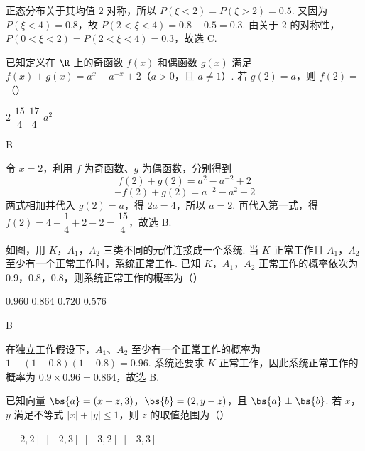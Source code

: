 \begin{solution}
正态分布关于其均值 \(2\) 对称，所以 \(P(\xi<2)=P(\xi>2)=0.5\). 又因为 \(P(\xi<4)=0.8\)，故 \(P(2<\xi<4)=0.8-0.5=0.3\). 由关于 \(2\) 的对称性，\(P(0<\xi<2)=P(2<\xi<4)=0.3\)，故选 C.
\end{solution}

\begin{problem}
已知定义在 \(\R\) 上的奇函数 \(f(x)\) 和偶函数 \(g(x)\) 满足 \(f(x)+g(x)=a^x-a^{-x}+2\)（\(a>0\)，且 \(a\neq1\)）. 若 \(g(2)=a\)，则 \(f(2)=\)（\quad）

\choices
    {\(2\)}
    {\(\dfrac{15}{4}\)}
    {\(\dfrac{17}{4}\)}
    {\(a^2\)}
\end{problem}

\begin{answer}
B
\end{answer}

\begin{solution}
令 \(x=2\)，利用 \(f\) 为奇函数、\(g\) 为偶函数，分别得到
\[
f(2)+g(2)=a^2-a^{-2}+2
\]
\[
-f(2)+g(2)=a^{-2}-a^2+2
\]
两式相加并代入 \(g(2)=a\)，得 \(2a=4\)，所以 \(a=2\). 再代入第一式，得 \(f(2)=4-\dfrac{1}{4}+2-2=\dfrac{15}{4}\)，故选 B.
\end{solution}

\begin{problem}
如图，用 \(K\)，\(A_{1}\)，\(A_{2}\) 三类不同的元件连接成一个系统. 当 \(K\) 正常工作且 \(A_{1}\)，\(A_{2}\) 至少有一个正常工作时，系统正常工作. 已知 \(K\)，\(A_{1}\)，\(A_{2}\) 正常工作的概率依次为 \(0.9\)，\(0.8\)，\(0.8\)，则系统正常工作的概率为（\quad）


\choices
    {\(0.960\)}
    {\(0.864\)}
    {\(0.720\)}
    {\(0.576\)}
\end{problem}

\begin{answer}
B
\end{answer}

\begin{solution}
在独立工作假设下，\(A_{1}\)、\(A_{2}\) 至少有一个正常工作的概率为 \(1-(1-0.8)(1-0.8)=0.96\). 系统还要求 \(K\) 正常工作，因此系统正常工作的概率为 \(0.9\times0.96=0.864\)，故选 B.
\end{solution}

\begin{problem}
已知向量 \(\bs{a}=(x+z,3)\)，\(\bs{b}=(2,y-z)\)，且 \(\bs{a}\perp\bs{b}\). 若 \(x\)，\(y\) 满足不等式 \(|x|+|y|\leqslant1\)，则 \(z\) 的取值范围为（\quad）

\choices
    {\([-2,2]\)}
    {\([-2,3]\)}
    {\([-3,2]\)}
    {\([-3,3]\)}
\end{problem}

